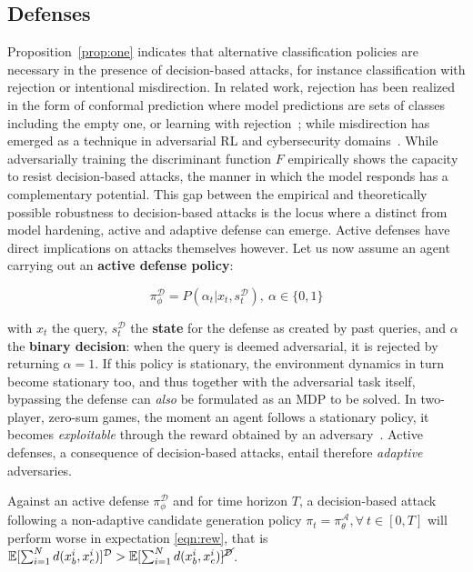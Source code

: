 \subsection{Defenses}

Proposition~\ref{prop:one} indicates that alternative classification policies are necessary in the presence of decision-based attacks, for instance classification with rejection or intentional misdirection.
In related work, rejection has been realized in the form of conformal prediction where model predictions are sets of classes including the empty one, or learning with rejection~\cite{barbero2022transcending, cortes2016learning}; while misdirection has emerged as a technique in adversarial RL and cybersecurity domains~\cite{gleave2020adversarial, sengupta2020multi}.
While adversarially training the discriminant function $F$ empirically shows the capacity to resist decision-based attacks, the manner in which the model responds has a complementary potential.
This gap between the empirical and theoretically possible robustness to decision-based attacks is the locus where a distinct from model hardening, active and adaptive defense can emerge.
Active defenses have direct implications on attacks themselves however.
Let us now assume an agent carrying out an \textbf{active defense policy}:

\begin{equation}
\pi_\phi^{\mathcal{D}} = P(\alpha_t|x_t,s^{\mathcal{D}}_t), \: \alpha \in \{0,1\}
\label{eqn:def}
\end{equation}

\noindent with $x_t$ the query, $s^{\mathcal{D}}_t$ the \textbf{state} for the defense as created by past queries, and $\alpha$ the \textbf{binary decision}: when the query is deemed adversarial, it is rejected by returning $\alpha=1$.
If this policy is stationary, the environment dynamics in turn become stationary too, and thus together with the adversarial task itself, bypassing the defense can \emph{also} be formulated as an MDP to be solved.
In two-player, zero-sum games, the moment an agent follows a stationary policy, it becomes \textit{exploitable} through the reward obtained by an adversary~\cite{timbers2022approximate}.
Active defenses, a consequence of decision-based attacks, entail therefore \textit{adaptive} adversaries.

\begin{proposition}
Against an active defense $\pi_\phi^{\mathcal{D}}$ and for time horizon $T$, a decision-based attack following a non-adaptive candidate generation policy $\pi_t = \pi_\theta^\mathcal{A}, \forall \: t \in [0,T]$ will perform worse in expectation \eqref{eqn:rew}, that is $\mathbb{E}[\sum_{i=1}^{N}d(x^i_b,x^i_c)]^{\mathcal{D}} > \mathbb{E}[\sum_{i=1}^{N}d(x^i_b,x^i_c)]^{\cancel{\mathcal{D}}}$.
\label{prop:two}
\end{proposition}

